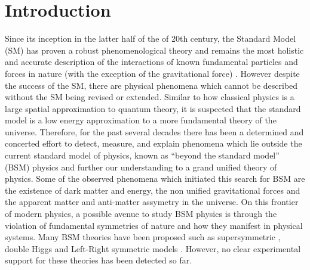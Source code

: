 \documentclass[10pt,a4paper, twoside, openright]{report}
\begin{document}
\chapter{Introduction} \label{chap:P1Intro}
Since its inception in the latter half of the of 20th century, the Standard Model (SM) has proven a robust phenomenological theory and remains the most holistic and accurate description of the interactions of known fundamental particles and forces in nature (with the exception of  the gravitational force) . However despite the success of the SM, there are  physical phenomena which cannot be described without the SM being revised or extended. Similar to how classical physics is a large spatial approximation to quantum theory, it is suspected that the standard model is a low energy approximation to a more fundamental theory of the universe.  Therefore, for the past several decades there has been a determined and concerted effort to detect, measure, and explain phenomena which lie outside the current standard model of physics, known as ``beyond the standard model'' (BSM) physics and further our understanding to a grand unified theory of physics.  Some of the observed phenomena which initiated this search for BSM are the existence of dark matter and energy, the non unified gravitational forces and the apparent matter and anti-matter assymetry in the universe. On this frontier of modern physics, a possible avenue to study BSM physics is through the violation of fundamental symmetries of nature and how they manifest in physical systems. Many BSM theories have been proposed such as supersymmetric \cite{Fayet1976, Fayet1977, Pospelov2005, Ramsey2008}, double Higgs \cite{Inoue2014} and Left-Right symmetric models \cite{Pati1974}. However, no clear experimental support for these theories has been detected so far. \\
\linebreak
\end{document}
